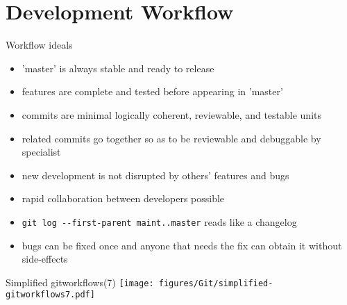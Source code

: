 \documentclass{beamer}
\begin{document}
\section{Development Workflow}
\begin{frame}{Workflow ideals}
  \begin{itemize}
  \item 'master' is always stable and ready to release
  \item features are complete and tested before appearing in 'master'
  \item commits are minimal logically coherent, reviewable, and testable units
  \item related commits go together so as to be reviewable and debuggable by specialist
  \item new development is not disrupted by others' features and bugs
  \item rapid collaboration between developers possible
  \item \texttt{git log -{}-first-parent maint..master} reads like a changelog
  \item bugs can be fixed once and anyone that needs the fix can obtain it without side-effects
  \end{itemize}
\end{frame}

\begin{frame}{Simplified gitworkflows(7)}
  \texttt{[image: figures/Git/simplified-gitworkflows7.pdf]}
\end{frame}
\end{document}
